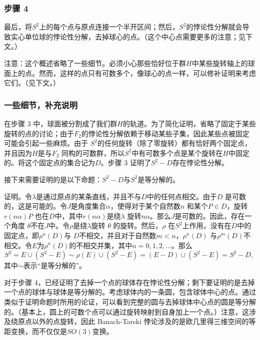 \subsubsection{步骤 4}  
最后，将\( S^2 \)上的每个点与原点连接一个半开区间；然后，\( S^2 \)的悖论性分解就会导致实心单位球的悖论性分解，去掉球心的点。（这个中心点需要更多的注意；见下文。）

注意：这个概述省略了一些细节。必须小心那些恰好位于群\( H \)中某些旋转轴上的球面上的点。然而，这样的点只有可数多个，像球心的点一样，可以修补证明来考虑它们。（见下文。）
\subsubsection{一些细节，补充说明}  
在步骤 3 中，球面被分割成了我们群\( H \)的轨道。为了简化证明，省略了固定于某些旋转的点的讨论；由于\( F_2 \)的悖论性分解依赖于移动某些子集，因此某些点被固定可能会引起一些麻烦。由于 \( S^2 \)的任何旋转（除了零旋转）都有恰好两个固定点，并且因为\( H \)是与\( F_2 \) 同构的可数群，所以\( S^2 \)中有可数多个点是某个旋转在\( H \)中固定的。将这个固定点的集合记为\( D \)。步骤 3 证明了\( S^2 - D \)存在悖论性分解。

接下来需要证明的是以下命题：\( S^2 - D \)与\( S^2 \)是等分解的。

证明。令\( \lambda \)是通过原点的某条直线，并且不与\( D \)中的任何点相交。由于\( D \) 是可数的，这是可能的。令\( J \)是角度集合\( \alpha \)，使得对于某个自然数\( n \) 和某个\( P \in D \)，旋转\( r(n\alpha)P \) 也在\( D \)中，其中\( r(n\alpha) \)是绕\( \lambda \) 旋转\( n\alpha \)。那么\( J \)是可数的。因此，存在一个角度 \( \theta\)不在\( J \)中。令\( \rho \)是绕\( \lambda \)旋转 \( \theta \) 的旋转。然后，\( \rho \) 在\( S^2 \)上作用，没有在\( D \)中的固定点，即\( \rho^n(D) \)与 \( D \)不相交，并且对于自然数\( m < n \)，\( \rho^n(D) \) 与\( \rho^m(D) \)不相交。令\( E \)为\( \rho^n(D) \)的不相交并集，其中\( n = 0, 1, 2, \dots \)。那么  
\[
S^2 = E \cup (S^2 - E) \sim \rho(E) \cup (S^2 - E) = (E - D) \cup (S^2 - E) = S^2 - D,~
\]
其中\( \sim \)表示“是等分解的”。

对于步骤 4，已经证明了去掉一个点的球体存在悖论性分解；剩下要证明的是去掉一个点的球体与球体是等分解的。考虑球体内的一条圆，包含球体中心的点。通过类似于证明命题时所用的论证，可以看到完整的圆与去掉球体中心点的圆是等分解的。（基本上，圆上的可数个点可以通过旋转映射到自身加上一个点。）注意，这涉及绕原点以外的点旋转，因此 Banach-Tarski 悖论涉及的是欧几里得三维空间的等距变换，而不仅仅是\( SO(3) \)变换。